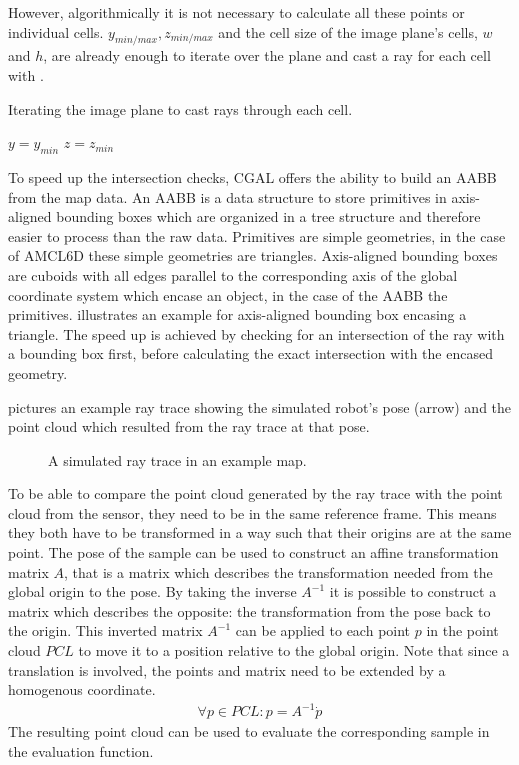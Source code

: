 \documentclass[Thesis.tex]{subfiles}
\begin{document}
However, algorithmically it is not necessary to calculate all these points or individual cells. $y_{min/max}, z_{min/max}$ and the cell size of the image plane's cells, $w$ and $h$, are already enough to iterate over the plane and cast a ray for each cell with .
%
\begin{algorithm}[!htp]
\label{alg:iterate_imageplane}
\caption{Iterating the image plane to cast rays through each cell.}
$y = y_{min}$\;
$z = z_{min}$\;
\end{algorithm}
%
To speed up the intersection checks, \gls{CGAL} offers the ability to build an \gls{AABB} from the map data\cite[]{cgal:atw-aabb-14b}. An \gls{AABB} is a data structure to store primitives in axis-aligned bounding boxes which are organized in a tree structure and therefore easier to process than the raw data. Primitives are simple geometries, in the case of \gls{AMCL6D} these simple geometries are triangles. Axis-aligned bounding boxes are cuboids with all edges parallel to the corresponding axis of the global coordinate system which encase an object, in the case of the \gls{AABB} the primitives.  illustrates an example for axis-aligned bounding box encasing a triangle. 
The speed up is achieved by checking for an intersection of the ray with a bounding box first, before calculating the exact intersection with the encased geometry.

 pictures an example ray trace showing the simulated robot's pose (arrow) and the point cloud which resulted from the ray trace at that pose.
\begin{figure}[!htp]
  \caption{A simulated ray trace in an example map.}
  \label{fig:raytrace}
\end{figure}
%
To be able to compare the point cloud generated by the ray trace with the point cloud from the sensor, they need to be in the same reference frame. This means they both have to be transformed in a way such that their origins are at the same point. The pose of the sample can be used to construct an affine transformation matrix $A$, that is a matrix which describes the transformation needed from the global origin to the pose. By taking the inverse $A^{-1}$ it is possible to construct a matrix which describes the opposite: the transformation from the pose back to the origin. This inverted matrix $A^{-1}$ can be applied to each point $p$ in the point cloud $PCL$ to move it to a position relative to the global origin. Note that since a translation is involved, the points and matrix need to be extended by a homogenous coordinate.
%
\begin{align}
  \forall p \in PCL: p = A^{-1} \dot p
\end{align}
%
The resulting point cloud can be used to evaluate the corresponding sample in the evaluation function.
%
%
%
\end{document}
